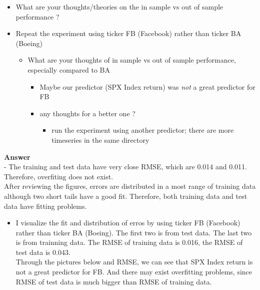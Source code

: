 \documentclass[11pt]{article}
\providecommand{\tightlist}{%
      \setlength{\itemsep}{0pt}\setlength{\parskip}{0pt}}
\begin{document}
    \begin{itemize}
\tightlist
\item
  What are your thoughts/theories on the in sample vs out of sample
  performance ?
\item
  Repeat the experiment using ticker FB (Facebook) rather than ticker BA
  (Boeing)

  \begin{itemize}
  \tightlist
  \item
    What are your thoughts of in sample vs out of sample performance,
    especially compared to BA

    \begin{itemize}
    \tightlist
    \item
      Maybe our predictor (SPX Index return) was \emph{not} a great
      predictor for FB
    \item
      any thoughts for a better one ?

      \begin{itemize}
      \tightlist
      \item
        run the experiment using another predictor; there are more
        timeseries in the same directory
      \end{itemize}
    \end{itemize}
  \end{itemize}
\end{itemize}

    \textbf{Answer}\\
- The training and test data have very close RMSE, which are 0.014 and
0.011. Therefore, overfiting does not exist.\\
After reviewing the figures, errors are distributed in a most range of
training data although two short tails have a good fit. Therefore, both
training data and test data have fitting problems.

    \begin{itemize}
\tightlist
\item
  I visualize the fit and distribution of erros by using ticker FB
  (Facebook) rather than ticker BA (Boeing). The first two is from test
  data. The last two is from trainning data. The RMSE of training data
  is 0.016, the RMSE of test data is 0.043.\\
  Through the pictures below and RMSE, we can see that SPX Index return
  is not a great predictor for FB. And there may exist overfitting
  problems, since RMSE of test data is much bigger than RMSE of training
  data.
\end{itemize}
\end{document}
